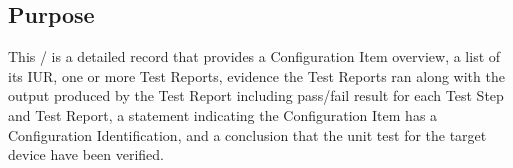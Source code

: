 \subsection{Purpose}
This \stdRptPkg/ is a detailed record that provides a Configuration Item
overview, a list of its IUR, one or more Test Reports, evidence the Test
Reports ran along with the output produced by the Test Report including
pass/fail result for each Test Step and Test Report, a statement indicating
the Configuration Item has a Configuration Identification, and a conclusion
that the unit test for the target device have been verified.
